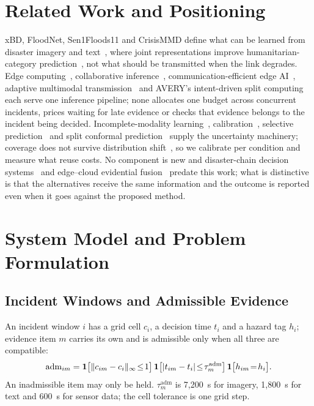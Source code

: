 \section{Related Work and Positioning}
xBD, FloodNet, Sen1Floods11 and CrisisMMD define what can be learned from disaster imagery and text~\cite{xbd,floodnet,sen1floods,crisismmd}, where joint representations improve humanitarian-category prediction~\cite{ofli2020}, not what should be transmitted when the link degrades. Edge computing~\cite{shi2016,satya2017}, collaborative inference~\cite{neurosurgeon}, communication-efficient edge AI~\cite{shi2020}, adaptive multimodal transmission~\cite{dat,cst} and AVERY's intent-driven split computing~\cite{avery} each serve one inference pipeline; none allocates one budget across concurrent incidents, prices waiting for late evidence or checks that evidence belongs to the incident being decided. Incomplete-modality learning~\cite{chen2023}, calibration~\cite{guo2017}, selective prediction~\cite{selectivenet} and split conformal prediction~\cite{sadinle,romano} supply the uncertainty machinery; coverage does not survive distribution shift~\cite{ovadia}, so we calibrate per condition and measure what reuse costs. No component is new and disaster-chain decision systems~\cite{patent1} and edge--cloud evidential fusion~\cite{patent2} predate this work; what is distinctive is that the alternatives receive the same information and the outcome is reported even when it goes against the proposed method.

\section{System Model and Problem Formulation}
\label{sec:model}
\subsection{Incident Windows and Admissible Evidence}
An incident window $i$ has a grid cell $c_i$, a decision time $t_i$ and a hazard tag $h_i$; evidence item $m$ carries its own and is admissible only when all three are compatible:
\begin{equation}
\label{eq:adm}
\small
\mathrm{adm}_{im} = \mathbf{1}\big[\|c_{im}-c_i\|_\infty\!\le\! 1\big]\,\mathbf{1}\big[|t_{im}-t_i|\!\le\!\tau^{\mathrm{adm}}_m\big]\,\mathbf{1}\big[h_{im}\!=\!h_i\big].
\end{equation}
An inadmissible item may only be held. $\tau^{\mathrm{adm}}_m$ is 7,200~s for imagery, 1,800~s for text and 600~s for sensor data; the cell tolerance is one grid step.


